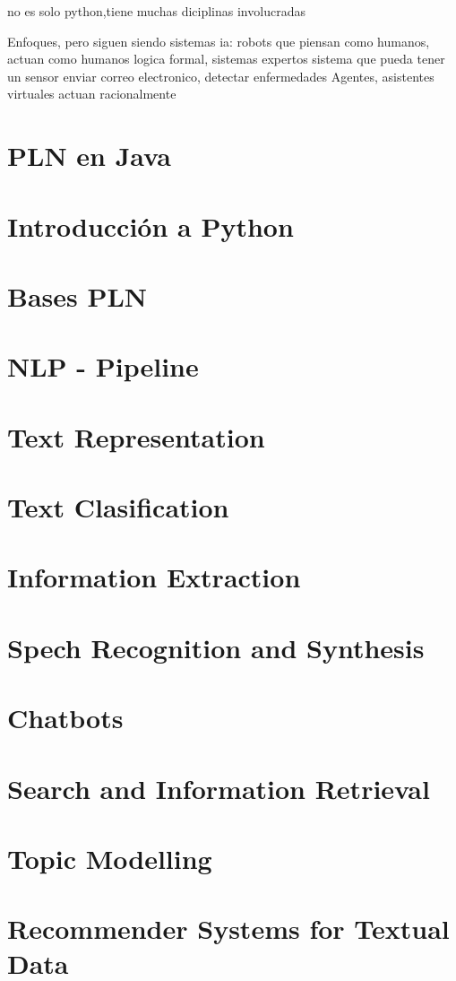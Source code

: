 \documentclass[a4paper]{report} %
\begin{document}
no es solo python,tiene muchas diciplinas involucradas

Enfoques, pero siguen siendo sistemas ia:
robots que piensan como humanos,
actuan como humanos
logica formal, sistemas expertos sistema que pueda tener un sensor enviar correo electronico, detectar enfermedades
Agentes, asistentes virtuales actuan racionalmente
            \\
    \part{PLN en Java}
    \part{Introducción a Python}
    \part{Bases PLN}
    \part{NLP - Pipeline}
    \part{Text Representation}
    \part{Text Clasification}
    \part{Information Extraction}
    \part{Spech Recognition and Synthesis}
    \part{Chatbots}
    \part{Search and Information Retrieval}
    \part{Topic Modelling}
    \part{Recommender Systems for Textual Data}
\end{document}
